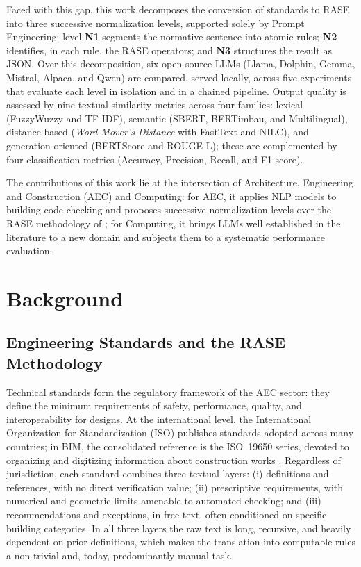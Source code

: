 \documentclass[a4paper,fleqn]{cas-sc}
\begin{document}
Faced with this gap, this work decomposes the conversion of standards to RASE into three successive normalization levels, supported solely by Prompt Engineering: level \textbf{N1} segments the normative sentence into atomic rules; \textbf{N2} identifies, in each rule, the RASE operators; and \textbf{N3} structures the result as JSON. Over this decomposition, six open-source LLMs (Llama, Dolphin, Gemma, Mistral, Alpaca, and Qwen) are compared, served locally, across five experiments that evaluate each level in isolation and in a chained pipeline. Output quality is assessed by nine textual-similarity metrics across four families: lexical (FuzzyWuzzy and TF-IDF), semantic (SBERT, BERTimbau, and Multilingual), distance-based (\textit{Word Mover's Distance} with FastText and NILC), and generation-oriented (BERTScore and ROUGE-L); these are complemented by four classification metrics (Accuracy, Precision, Recall, and F1-score).

The contributions of this work lie at the intersection of Architecture, Engineering and Construction (AEC) and Computing: for AEC, it applies NLP models to building-code checking and proposes successive normalization levels over the RASE methodology of \citet{hjelseth2011}; for Computing, it brings LLMs well established in the literature to a new domain and subjects them to a systematic performance evaluation.

\section{Background}\label{sec:background}

\subsection{Engineering Standards and the RASE Methodology}\label{sec:standards-rase}
Technical standards form the regulatory framework of the AEC sector: they define the minimum requirements of safety, performance, quality, and interoperability for designs. At the international level, the International Organization for Standardization (ISO) publishes standards adopted across many countries; in BIM, the consolidated reference is the ISO~19650 series, devoted to organizing and digitizing information about construction works \citep{iso19650}. Regardless of jurisdiction, each standard combines three textual layers: (i) definitions and references, with no direct verification value; (ii) prescriptive requirements, with numerical and geometric limits amenable to automated checking; and (iii) recommendations and exceptions, in free text, often conditioned on specific building categories. In all three layers the raw text is long, recursive, and heavily dependent on prior definitions, which makes the translation into computable rules a non-trivial and, today, predominantly manual task.
\end{document}
